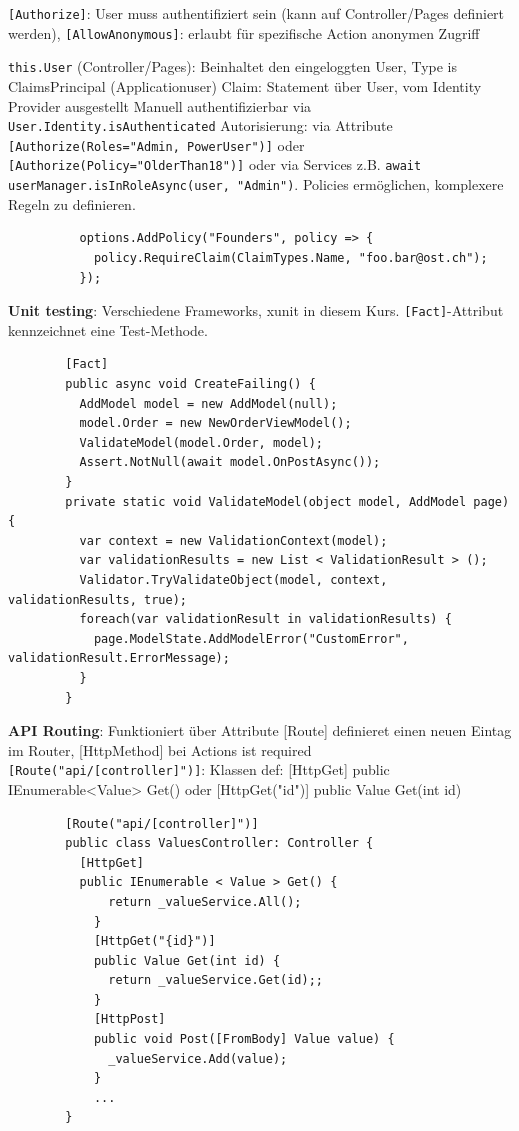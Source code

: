 \documentclass[10pt,landscape]{article}
\begin{document}
\begin{multicols}{2}
        \lstinline{[Authorize]}: User muss authentifiziert sein (kann auf Controller/Pages definiert werden), \lstinline{[AllowAnonymous]}: erlaubt für spezifische Action anonymen Zugriff

        \lstinline{this.User} (Controller/Pages): Beinhaltet den eingeloggten User, Type is ClaimsPrincipal (Applicationuser)
        Claim: Statement über User, vom Identity Provider ausgestellt
        Manuell authentifizierbar via \lstinline{User.Identity.isAuthenticated}
        Autorisierung: via Attribute \lstinline{[Authorize(Roles="Admin, PowerUser")]} oder \lstinline{[Authorize(Policy="OlderThan18")]} oder via Services z.B. \lstinline{await userManager.isInRoleAsync(user, "Admin")}.
        Policies ermöglichen, komplexere Regeln zu definieren.

        \begin{lstlisting}
          options.AddPolicy("Founders", policy => {
            policy.RequireClaim(ClaimTypes.Name, "foo.bar@ost.ch");
          });
        \end{lstlisting}

        \textbf{Unit testing}: Verschiedene Frameworks, xunit in diesem Kurs.
        \lstinline{[Fact]}-Attribut kennzeichnet eine Test-Methode.

        \begin{lstlisting}
        [Fact]
        public async void CreateFailing() {
          AddModel model = new AddModel(null);
          model.Order = new NewOrderViewModel();
          ValidateModel(model.Order, model);
          Assert.NotNull(await model.OnPostAsync());
        }
        private static void ValidateModel(object model, AddModel page) {
          var context = new ValidationContext(model);
          var validationResults = new List < ValidationResult > ();
          Validator.TryValidateObject(model, context, validationResults, true);
          foreach(var validationResult in validationResults) {
            page.ModelState.AddModelError("CustomError", validationResult.ErrorMessage);
          }
        }
        \end{lstlisting}

        \textbf{API Routing}: Funktioniert über Attribute [Route] definieret einen neuen Eintag im Router, [HttpMethod] bei Actions ist required
        \lstinline{[Route("api/[controller]")]}: Klassen def: [HttpGet] public IEnumerable<Value> Get()  oder [HttpGet("{id}")] public Value Get(int id)

        \begin{lstlisting}
        [Route("api/[controller]")]
        public class ValuesController: Controller {
          [HttpGet]
          public IEnumerable < Value > Get() {
              return _valueService.All();
            }
            [HttpGet("{id}")]
            public Value Get(int id) {
              return _valueService.Get(id);;
            }
            [HttpPost]
            public void Post([FromBody] Value value) {
              _valueService.Add(value);
            }
            ...
        }
        \end{lstlisting}


\end{multicols}
\end{document}

